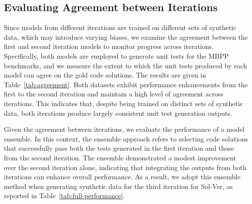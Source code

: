 \subsection{Evaluating Agreement between Iterations}

Since models from different iterations are trained on different sets of synthetic data, which may introduce varying biases, we examine the agreement between the first and second iteration models to monitor progress across iterations. Specifically, both models are employed to generate unit tests for the MBPP benchmarks, and we measure the extent to which the unit tests produced by each model can agree on the gold code solutions. The results are given in Table~\ref{tab:agreement}.
Both datasets exhibit performance enhancements from the first to the second iteration and maintain a high level of agreement across iterations. This indicates that, despite being trained on distinct sets of synthetic data, both iterations produce largely consistent unit test generation outputs.

Given the agreement between iterations, we evaluate the performance of a model ensemble.
In this context, the ensemble approach refers to selecting code solutions that successfully pass both the tests generated in the first iteration and those from the second iteration.
The ensemble demonstrated a modest improvement over the second iteration alone, indicating that integrating the outputs from both iterations can enhance overall performance. As a result, we adopt this ensemble method when generating synthetic data for the third iteration for {\sc Sol-Ver}, as reported in Table~\ref{tab:full-performance}.

